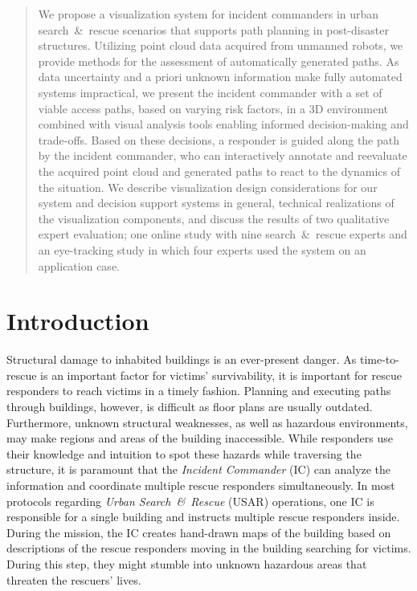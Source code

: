 \documentclass{egpubl}
\begin{document}
\begin{abstract}
We propose a visualization system for incident commanders in urban search~\&~rescue scenarios that supports path planning in post-disaster structures. Utilizing point cloud data acquired from unmanned robots, we provide methods for the assessment of automatically generated paths. As data uncertainty and a priori unknown information make fully automated systems impractical, we present the incident commander with a set of viable access paths, based on varying risk factors, in a 3D environment combined with visual analysis tools enabling informed decision-making and trade-offs. Based on these decisions, a responder is guided along the path by the incident commander, who can interactively annotate and reevaluate the acquired point cloud and generated paths to react to the dynamics of the situation. We describe visualization design considerations for our system and decision support systems in general, technical realizations of the visualization components, and discuss the results of two qualitative expert evaluation; one online study with nine search~\&~rescue experts and an eye-tracking study in which four experts used the system on an application case.

\begin{classification}
\end{classification}

\end{abstract}

\section{Introduction}
Structural damage to inhabited buildings is an ever-present danger. As time-to-rescue is an important factor for victims' survivability, it is important for rescue responders to reach victims in a timely fashion. Planning and executing paths through buildings, however, is difficult as floor plans are usually outdated. Furthermore, unknown structural weaknesses, as well as hazardous environments, may make regions and areas of the building inaccessible. While responders use their knowledge and intuition to spot these hazards while traversing the structure, it is paramount that the \emph{Incident Commander} (IC) can analyze the information and coordinate multiple rescue responders simultaneously. In most protocols regarding \emph{Urban Search~\&~Rescue} (USAR) operations, one IC is responsible for a single building and instructs multiple rescue responders inside. During the mission, the IC creates hand-drawn maps of the building based on descriptions of the rescue responders moving in the building searching for victims. During this step, they might stumble into unknown hazardous areas that threaten the rescuers' lives.
\end{document}
